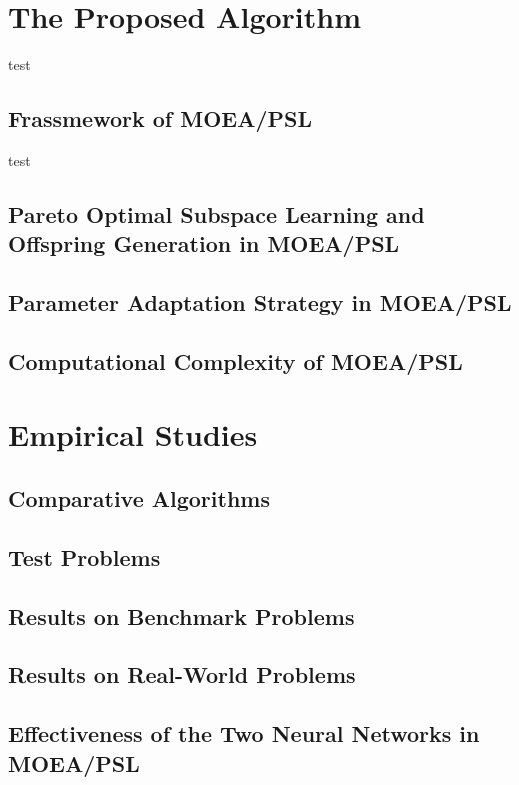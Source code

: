 \documentclass[journal]{IEEEtran}
\begin{document}
\section{The Proposed Algorithm}
test
\subsection{Frassmework of MOEA/PSL}
test
\subsection{Pareto Optimal Subspace Learning and Offspring Generation in MOEA/PSL}

\subsection{Parameter Adaptation Strategy in MOEA/PSL}

\subsection{Computational Complexity of MOEA/PSL}


\section{Empirical Studies}


\subsection{Comparative Algorithms}

\subsection{Test Problems}

\subsection{Results on Benchmark Problems}

\subsection{Results on Real-World Problems}

\subsection{Effectiveness of the Two Neural Networks in MOEA/PSL}\label{sec:twoNNs}
\end{document}
